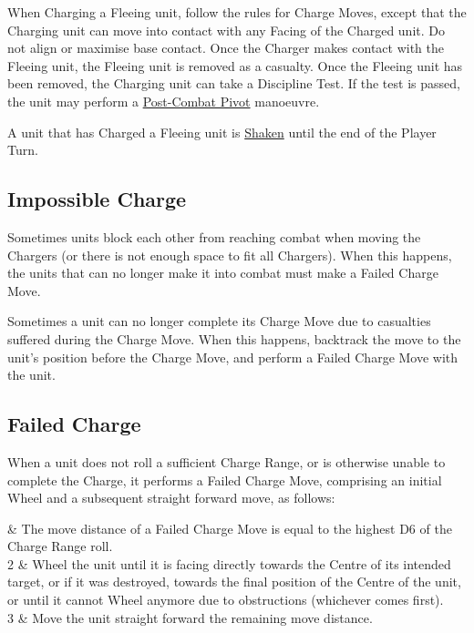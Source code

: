 When Charging a Fleeing unit, follow the rules for Charge Moves, except that the Charging unit can move into contact with any Facing of the Charged unit. Do not align or maximise base contact. Once the Charger makes contact with the Fleeing unit, the Fleeing unit is removed as a casualty. Once the Fleeing unit has been removed, the Charging unit can take a Discipline Test. If the test is passed, the unit may perform a \hyperref[post_combat_pivot]{Post-Combat Pivot} manoeuvre.

A unit that has Charged a Fleeing unit is \hyperref[shaken]{Shaken} until the end of the Player Turn.

\columnbreak

\subsection{Impossible Charge}
\label{impossible_charge}

Sometimes units block each other from reaching combat when moving the Chargers (or there is not enough space to fit all Chargers). When this happens, the units that can no longer make it into combat must make a Failed Charge Move.

Sometimes a unit can no longer complete its Charge Move due to casualties suffered during the Charge Move. When this happens, backtrack the move to the unit's position before the Charge Move, and perform a Failed Charge Move with the unit.

\subsection{Failed Charge}
\label{failed_charge}

When a unit does not roll a sufficient Charge Range, or is otherwise unable to complete the Charge, it performs a Failed Charge Move, comprising an initial Wheel and a subsequent straight forward move, as follows:

 & The move distance of a Failed Charge Move is equal to the highest D6 of the Charge Range roll.\\
	2 & Wheel the unit until it is facing directly towards the Centre of its intended target, or if it was destroyed, towards the final position of the Centre of the unit, or until it cannot Wheel anymore due to obstructions (whichever comes first).\\
	3 & Move the unit straight forward the remaining move distance.\\
\closeseqtablemc

